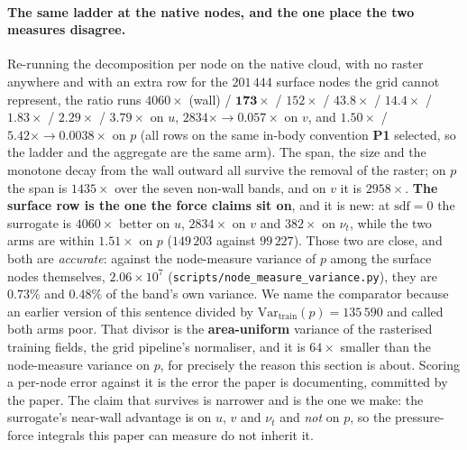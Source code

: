 \paragraph{The same ladder at the native nodes, and the one place the two measures
disagree.} Re-running the decomposition per node on the native cloud, with no raster
anywhere and with an extra row for the $201\,444$ surface nodes the grid cannot represent,
the ratio runs $4060\times$ (wall) / $\mathbf{173}\times$ / $152\times$ / $43.8\times$ /
$14.4\times$ / $1.83\times$ / $2.29\times$ / $\mathbf{3.79}\times$ on $u$, $2834\times \to
0.057\times$ on $v$, and $1.50\times$ / $\mathbf{5.42}\times \to \mathbf{0.0038}\times$ on
$p$ (all rows on the same in-body convention \textbf{P1} selected, so the ladder and the
aggregate are the same arm). The span, the size and the monotone decay from the wall
outward all survive the removal of the raster; on $p$ the span is $1435\times$ over the
seven non-wall bands, and on $v$ it is $2958\times$. \textbf{The surface row is the one the
force claims sit on}, and it is new: at $\mathrm{sdf}=0$ the surrogate is $4060\times$
better on $u$, $2834\times$ on $v$ and $382\times$ on $\nu_t$, while the two arms are
within $1.51\times$ on $p$ ($149\,203$ against $99\,227$). Those two are close, and both
are \emph{accurate}: against the node-measure variance of $p$ among the surface nodes
themselves, $2.06\times10^{7}$
(\texttt{scripts\slash{}node\_measure\_variance.py}), they are $0.73\%$ and $0.48\%$ of the band's
own variance. We name the comparator because an earlier version of this sentence divided by
$\mathrm{Var}_{\text{train}}(p)=135\,590$ and called both arms poor. That divisor is the
\textbf{area-uniform} variance of the rasterised training fields, the grid pipeline's
normaliser, and it is $64\times$ smaller than the node-measure variance on $p$, for
precisely the reason this section is about. Scoring a per-node error against it is the error the paper is documenting,
committed by the paper. The claim that survives is narrower and is the one we make: the
surrogate's near-wall advantage is on $u$, $v$ and $\nu_t$ and \emph{not} on $p$, so the
pressure-force integrals this paper can measure do not inherit it.

